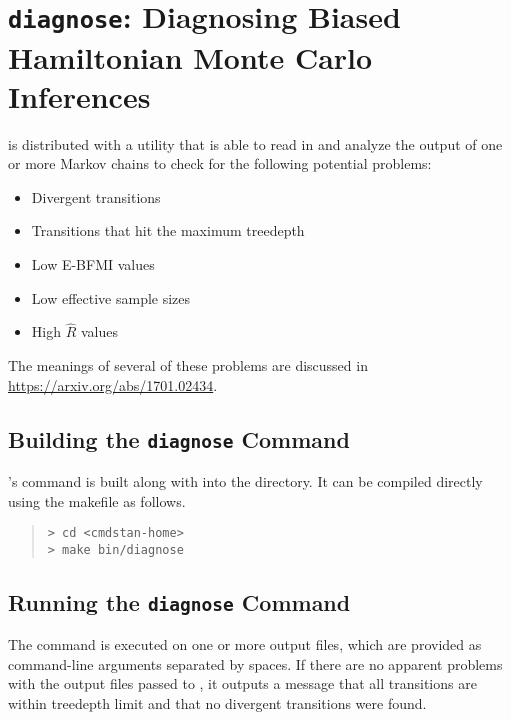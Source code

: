 \chapter{{\tt\bfseries diagnose}: Diagnosing Biased Hamiltonian Monte Carlo Inferences}\label{diagnose.chapter}

\noindent
\CmdStan is distributed with a utility that is able to read in and
analyze the output of one or more Markov chains to check for the
following potential problems:

\begin{itemize}
\item Divergent transitions
\item Transitions that hit the maximum treedepth
\item Low E-BFMI values
\item Low effective sample sizes
\item High $\hat{R}$ values
\end{itemize}

The meanings of several of these problems are discussed in \url{https://arxiv.org/abs/1701.02434}.


\section{Building the {\tt\bfseries diagnose} Command}

\CmdStan's  command is built along with  into
the  directory. It can be compiled directly using the
makefile as follows.
%
\begin{quote}
\begin{Verbatim}[fontshape=sl]
> cd <cmdstan-home>
> make bin/diagnose
\end{Verbatim}
\end{quote}
%

\section{Running the {\tt\bfseries diagnose} Command}

The  command is executed on one or more output files,
which are provided as command-line arguments separated by spaces.
If there are no apparent problems with the output files passed to
, it outputs a message that all transitions
are within treedepth limit and that no divergent transitions were found.

